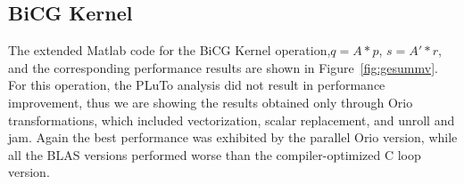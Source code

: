 \documentclass[11pt]{article}
\begin{document}
%



\subsection{BiCG Kernel}

The extended Matlab code for the BiCG Kernel operation,$q = A * p$, $s = A' * r$,
and the corresponding performance results are shown in Figure~\ref{fig:gesummv}. For this operation, the PLuTo analysis did not result in performance improvement, thus we are showing the results obtained only through Orio transformations, which included vectorization, scalar replacement, and unroll and jam. Again the best performance was exhibited by the parallel Orio version, while all the BLAS versions performed worse than the compiler-optimized C loop version.
\end{document}
